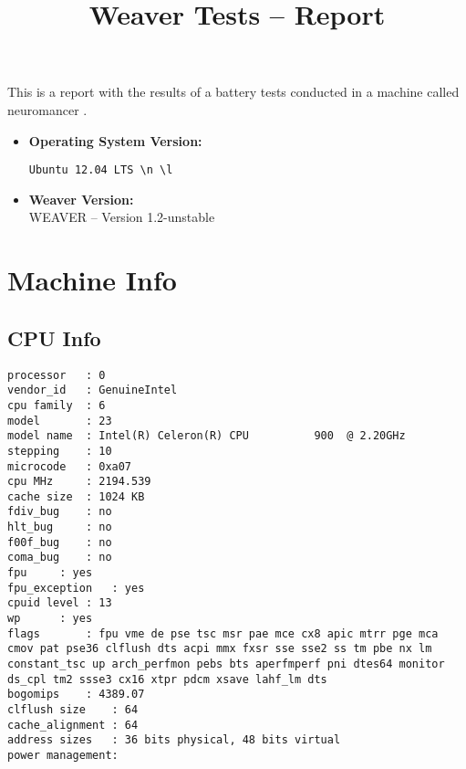 \documentclass{article}
\title{Weaver Tests -- Report}
\begin{document}
\maketitle
This is a report with the results of a battery
tests conducted in a machine called 
neuromancer
.
\begin{itemize}
\item
\textbf{Operating System Version: }
\begin{verbatim}
Ubuntu 12.04 LTS \n \l

\end{verbatim}
\item
\textbf{Weaver Version: }\\
WEAVER -- Version 1.2-unstable
\end{itemize}
\section{Machine Info}
\subsection{CPU Info}
\begin{verbatim}
processor	: 0
vendor_id	: GenuineIntel
cpu family	: 6
model		: 23
model name	: Intel(R) Celeron(R) CPU          900  @ 2.20GHz
stepping	: 10
microcode	: 0xa07
cpu MHz		: 2194.539
cache size	: 1024 KB
fdiv_bug	: no
hlt_bug		: no
f00f_bug	: no
coma_bug	: no
fpu		: yes
fpu_exception	: yes
cpuid level	: 13
wp		: yes
flags		: fpu vme de pse tsc msr pae mce cx8 apic mtrr pge mca cmov pat pse36 clflush dts acpi mmx fxsr sse sse2 ss tm pbe nx lm constant_tsc up arch_perfmon pebs bts aperfmperf pni dtes64 monitor ds_cpl tm2 ssse3 cx16 xtpr pdcm xsave lahf_lm dts
bogomips	: 4389.07
clflush size	: 64
cache_alignment	: 64
address sizes	: 36 bits physical, 48 bits virtual
power management:

\end{verbatim}
\end{document}
